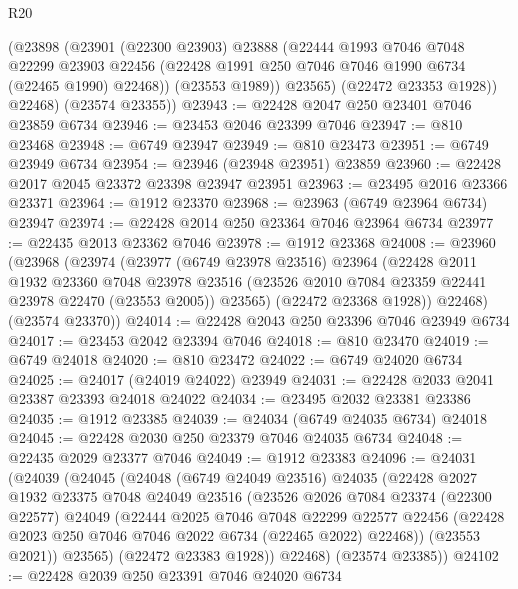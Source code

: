 \begin{lexlean}{R20}
\begin{coremodule}
{          (@23898
            (@23901
              (@22300 @23903)
              @23888
              (@22444
                @1993
                @7046
                @7048
                @22299
                @23903
                @22456
                (@22428 @1991 @250 @7046 @7046 @1990 @6734 (@22465 @1990) @22468))
              (@23553 @1989))
            @23565)
          (@22472 @23353 @1928))
        @22468)
      (@23574 @23355))
@23943 := @22428 @2047 @250 @23401 @7046 @23859 @6734
@23946 := @23453 @2046 @23399 @7046
@23947 := @810 @23468
@23948 := @6749 @23947
@23949 := @810 @23473
@23951 := @6749 @23949 @6734
@23954 := @23946 (@23948 @23951) @23859
@23960 := @22428 @2017 @2045 @23372 @23398 @23947 @23951
@23963 := @23495 @2016 @23366 @23371
@23964 := @1912 @23370
@23968 := @23963 (@6749 @23964 @6734) @23947
@23974 := @22428 @2014 @250 @23364 @7046 @23964 @6734
@23977 := @22435 @2013 @23362 @7046
@23978 := @1912 @23368
@24008 := @23960
    (@23968
      (@23974
        (@23977
          (@6749 @23978 @23516)
          @23964
          (@22428
            @2011
            @1932
            @23360
            @7048
            @23978
            @23516
            (@23526 @2010 @7084 @23359 @22441 @23978 @22470 (@23553 @2005))
            @23565)
          (@22472 @23368 @1928))
        @22468)
      (@23574 @23370))
@24014 := @22428 @2043 @250 @23396 @7046 @23949 @6734
@24017 := @23453 @2042 @23394 @7046
@24018 := @810 @23470
@24019 := @6749 @24018
@24020 := @810 @23472
@24022 := @6749 @24020 @6734
@24025 := @24017 (@24019 @24022) @23949
@24031 := @22428 @2033 @2041 @23387 @23393 @24018 @24022
@24034 := @23495 @2032 @23381 @23386
@24035 := @1912 @23385
@24039 := @24034 (@6749 @24035 @6734) @24018
@24045 := @22428 @2030 @250 @23379 @7046 @24035 @6734
@24048 := @22435 @2029 @23377 @7046
@24049 := @1912 @23383
@24096 := @24031
    (@24039
      (@24045
        (@24048
          (@6749 @24049 @23516)
          @24035
          (@22428
            @2027
            @1932
            @23375
            @7048
            @24049
            @23516
            (@23526
              @2026
              @7084
              @23374
              (@22300 @22577)
              @24049
              (@22444
                @2025
                @7046
                @7048
                @22299
                @22577
                @22456
                (@22428 @2023 @250 @7046 @7046 @2022 @6734 (@22465 @2022) @22468))
              (@23553 @2021))
            @23565)
          (@22472 @23383 @1928))
        @22468)
      (@23574 @23385))
@24102 := @22428 @2039 @250 @23391 @7046 @24020 @6734
}
\end{coremodule}
\end{lexlean}
